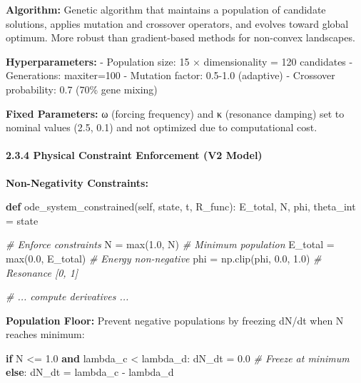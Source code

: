 \documentclass[
]{article}
\newenvironment{Shaded}{}{}
\newcommand{\BuiltInTok}[1]{\textcolor[rgb]{0.00,0.50,0.00}{#1}}
\newcommand{\CommentTok}[1]{\textcolor[rgb]{0.38,0.63,0.69}{\textit{#1}}}
\newcommand{\ControlFlowTok}[1]{\textcolor[rgb]{0.00,0.44,0.13}{\textbf{#1}}}
\newcommand{\FloatTok}[1]{\textcolor[rgb]{0.25,0.63,0.44}{#1}}
\newcommand{\KeywordTok}[1]{\textcolor[rgb]{0.00,0.44,0.13}{\textbf{#1}}}
\newcommand{\NormalTok}[1]{#1}
\newcommand{\OperatorTok}[1]{\textcolor[rgb]{0.40,0.40,0.40}{#1}}
\newcommand{\VariableTok}[1]{\textcolor[rgb]{0.10,0.09,0.49}{#1}}
\begin{document}
\textbf{Algorithm:} Genetic algorithm that maintains a population of
candidate solutions, applies mutation and crossover operators, and
evolves toward global optimum. More robust than gradient-based methods
for non-convex landscapes.

\textbf{Hyperparameters:} - Population size: 15 × dimensionality = 120
candidates - Generations: maxiter=100 - Mutation factor: 0.5-1.0
(adaptive) - Crossover probability: 0.7 (70\% gene mixing)

\textbf{Fixed Parameters:} ω (forcing frequency) and κ (resonance
damping) set to nominal values (2.5, 0.1) and not optimized due to
computational cost.

\paragraph{2.3.4 Physical Constraint Enforcement (V2
Model)}\label{physical-constraint-enforcement-v2-model}

\textbf{Non-Negativity Constraints:}

\begin{Shaded}
\begin{Highlighting}[]
\KeywordTok{def}\NormalTok{ ode\_system\_constrained(}\VariableTok{self}\NormalTok{, state, t, R\_func):}
\NormalTok{    E\_total, N, phi, theta\_int }\OperatorTok{=}\NormalTok{ state}

    \CommentTok{\# Enforce constraints}
\NormalTok{    N }\OperatorTok{=} \BuiltInTok{max}\NormalTok{(}\FloatTok{1.0}\NormalTok{, N)              }\CommentTok{\# Minimum population}
\NormalTok{    E\_total }\OperatorTok{=} \BuiltInTok{max}\NormalTok{(}\FloatTok{0.0}\NormalTok{, E\_total)  }\CommentTok{\# Energy non{-}negative}
\NormalTok{    phi }\OperatorTok{=}\NormalTok{ np.clip(phi, }\FloatTok{0.0}\NormalTok{, }\FloatTok{1.0}\NormalTok{) }\CommentTok{\# Resonance [0, 1]}

    \CommentTok{\# ... compute derivatives ...}
\end{Highlighting}
\end{Shaded}

\textbf{Population Floor:} Prevent negative populations by freezing
dN/dt when N reaches minimum:

\begin{Shaded}
\begin{Highlighting}[]
\ControlFlowTok{if}\NormalTok{ N }\OperatorTok{\textless{}=} \FloatTok{1.0} \KeywordTok{and}\NormalTok{ lambda\_c }\OperatorTok{\textless{}}\NormalTok{ lambda\_d:}
\NormalTok{    dN\_dt }\OperatorTok{=} \FloatTok{0.0}  \CommentTok{\# Freeze at minimum}
\ControlFlowTok{else}\NormalTok{:}
\NormalTok{    dN\_dt }\OperatorTok{=}\NormalTok{ lambda\_c }\OperatorTok{{-}}\NormalTok{ lambda\_d}
\end{Highlighting}
\end{Shaded}
\end{document}
